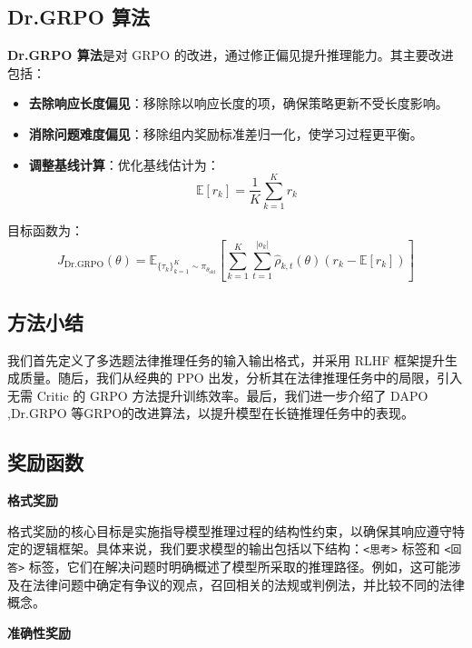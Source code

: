 \documentclass{pkuthesis}
\begin{document}
\subsection{Dr.GRPO 算法}
\textbf{Dr.GRPO 算法}\cite{liu2025understanding}是对 GRPO 的改进，通过修正偏见提升推理能力。其主要改进包括：
\begin{itemize}
    \item \textbf{去除响应长度偏见}：移除除以响应长度的项，确保策略更新不受长度影响。
    \item \textbf{消除问题难度偏见}：移除组内奖励标准差归一化，使学习过程更平衡。
    \item \textbf{调整基线计算}：优化基线估计为：
    \[
    \mathbb{E}[r_k] = \frac{1}{K} \sum_{k=1}^K r_k
    \]
\end{itemize}
目标函数为：
\[
J_{\text{Dr.GRPO}}(\theta) = \mathbb{E}_{\{\tau_k\}_{k=1}^K \sim \pi_{\theta_{\text{old}}}}\left[\sum_{k=1}^{K} \sum_{t=1}^{|o_k|} \hat{\rho}_{k,t}(\theta) (r_k - \mathbb{E}[r_k])\right]
\]

\subsection{方法小结}
我们首先定义了多选题法律推理任务的输入输出格式，并采用 RLHF 框架提升生成质量。随后，我们从经典的 PPO \cite{schulman2017proximal}出发，分析其在法律推理任务中的局限，引入无需 Critic 的 GRPO 方法\cite{shao2024deepseekmath}提升训练效率。最后，我们进一步介绍了 DAPO \cite{yu2025dapo},Dr.GRPO \cite{liu2025understanding}等GRPO的改进算法，以提升模型在长链推理任务中的表现。


\subsection{奖励函数}
\textbf{格式奖励}

格式奖励的核心目标是实施指导模型推理过程的结构性约束，以确保其响应遵守特定的逻辑框架。具体来说，我们要求模型的输出包括以下结构：\texttt{<思考>} 标签和 \texttt{<回答>} 标签，它们在解决问题时明确概述了模型所采取的推理路径\cite{guo2025deepseek}。例如，这可能涉及在法律问题中确定有争议的观点，召回相关的法规或判例法，并比较不同的法律概念。

\textbf{准确性奖励}
\end{document}
